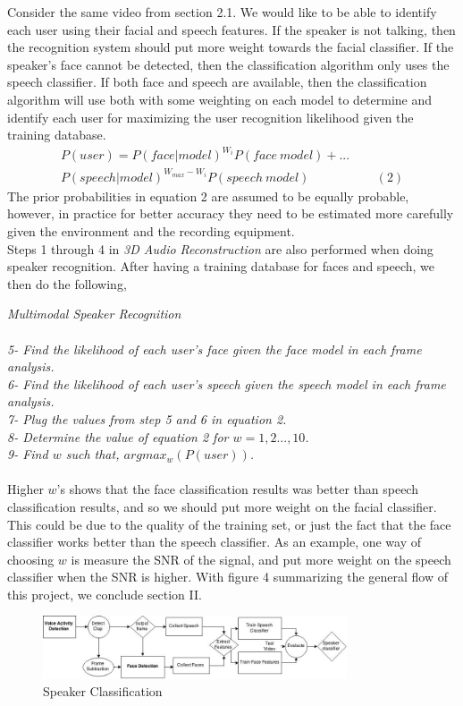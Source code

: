 \documentclass{article}
\begin{document}
Consider the same video from section 2.1. We would like to be able to identify each user using their facial and speech features. If the speaker is not talking, then the recognition system should put more weight towards the facial classifier. If the speaker's face cannot be detected, then the classification algorithm only uses the speech classifier. If both face and speech are available, then the classification algorithm will use both with some weighting on each model to determine and identify each user for maximizing the user recognition likelihood given the training database. 
\begin{align*}
P(user) = P(face|model)^{W_i}P(face \ model)+...\\P(speech|model)^{W_{max}-W_i}P(speech \ model)
\ \ \ \ \ \ \ \ \ \ \ \ \ \ \ \ \ \ \ \ \ \ \ \ (2)
\end{align*}
The prior probabilities in equation 2 are assumed to be equally probable, however, in practice for better accuracy they need to be estimated more carefully given the environment and the recording equipment. \\
Steps 1 through 4 in {\it 3D Audio Reconstruction} are also performed when doing speaker recognition. After having a training database for faces and speech, we then do the following, 
\centerline{}
{\it Multimodal Speaker Recognition \\ \\
5- Find the likelihood of each user's face given the face model in each frame analysis. \\
6- Find the likelihood of each user's speech given the speech model in each frame analysis.\\ 
7- Plug the values from step 5 and 6 in equation 2. \\ 
8- Determine the value of equation 2 for $w=1, 2..., 10$. \\
9- Find $w$ such that, $argmax_w(P(user))$. }\\
\\ Higher $w$'s shows that the face classification results was better than speech classification results, and so we should put more weight on the facial classifier. This could be due to the quality of the training set, or just the fact that the face classifier works better than the speech classifier. As an example, one way of choosing $w$ is measure the SNR of the signal, and put more weight on the speech classifier when the SNR is higher. With figure 4 summarizing the general flow of this project, we conclude section II. 
\begin{figure}[htb]
\begin{minipage}[b]{0.98\linewidth}
\centering
\centerline{\includegraphics[width=9.0cm]{project_598ps.jpg}}
\end{minipage}
\caption{Speaker Classification}
\label{fig:res}
\end{figure}
\end{document}
